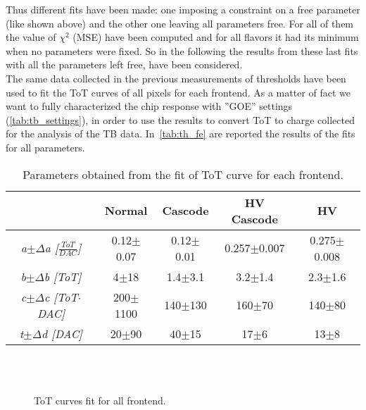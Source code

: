 
Thus different fits have been made: one imposing a constraint on a free parameter (like shown above) and the other one leaving all parameters free. For all of them the value of $\chi^{2}$ (MSE) have been computed and for all flavors it had its minimum when no parameters were fixed. So in the following the results from these last fits with all the parameters left free, have been considered.\\

The same data collected in the previous measurements of thresholds have been used to fit the ToT curves of all pixels for each frontend. As a matter of fact we want to fully characterized the chip response with ''GOE'' settings (\autoref{tab:tb_settings}), in order to use the results to convert ToT to charge collected for the analysis of the TB data.
In~\autoref{tab:th_fe} are reported the results of the fits for all parameters.

\begin{table}[h!]
\centering
\begin{tabular}{c|c|c|c|c}
 & \textbf{Normal} & \textbf{Cascode} & \textbf{HV Cascode} & \textbf{HV} \\
\hline
\hline
\textit{a$\pm\Delta$a [$\frac{ToT}{DAC}$]} & 0.12$\pm$0.07 & 0.12$\pm$0.01 & 0.257$\pm$0.007 & 0.275$\pm$0.008 \\
\hline
\textit{b$\pm\Delta$b [ToT]} & 4$\pm$18 & 1.4$\pm$3.1 & 3.2$\pm$1.4 & 2.3$\pm$1.6 \\
\hline
\textit{c$\pm\Delta$c [ToT$\cdot$DAC]} & 200$\pm$1100 & 140$\pm$130 & 160$\pm$70 & 140$\pm$80 \\
\hline
\textit{t$\pm\Delta$d [DAC]} & 20$\pm$90 & 40$\pm$15 & 17$\pm$6 & 13$\pm$8 \\
\hline
\hline
\end{tabular}
\caption{Parameters obtained from the fit of ToT curve for each frontend.}
\label{tab:th_fe}
\end{table}

\begin{figure}[h!]
\centering
{}\quad
{}\\
\quad
{}\\
\caption{ToT curves fit for all frontend.}
\label{fig:tot_fe}
\end{figure}


